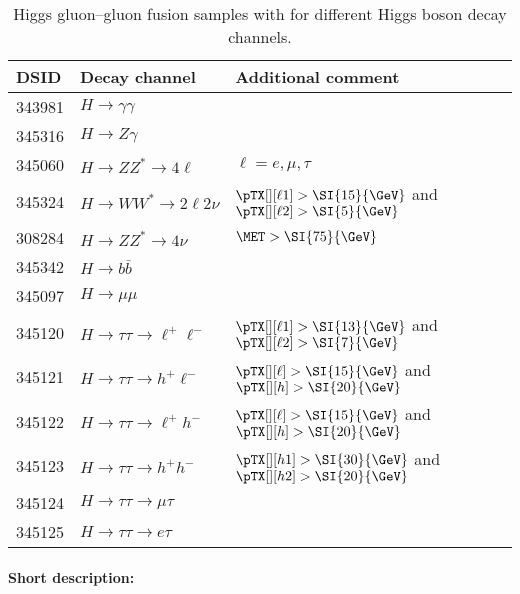 \begin{table}[!htbp]
  \caption{\POWHEG Higgs gluon--gluon fusion samples with \POWPY[8] for different Higgs boson decay channels.}%
  \label{tab:higgs-ggH-samples}
  \centering
  \begin{tabular}{ l | l | l}
    \toprule
    DSID   & Decay channel & Additional comment \\
    \midrule
    343981 & $H\to\gamma\gamma$&   \\
    345316 & $H\to Z\gamma$ & \\
    345060 & $H\to ZZ^{*} \to 4\ell $ & $\ell=e,\mu,\tau$   \\
    345324 & $H\to WW^{*} \to 2\ell2\nu $ &  $\pTX[][\ell1] > \SI{15}{\GeV}$ and $\pTX[][\ell2] > \SI{5}{\GeV}$ \\
    308284 & $H\to ZZ^{*}\to 4\nu$ & $\MET > \SI{75}{\GeV}$\\
    345342 & $H\to b \bar{b}$ & \\
    345097 & $H\to\mu\mu$      &     \\
    345120 & $H\to\tau\tau\to \ell^{+}\ell^{-}$ & $\pTX[][\ell1] > \SI{13}{\GeV}$ and $\pTX[][\ell2] > \SI{7}{\GeV}$ \\
    345121 & $H\to\tau\tau\to h^{+}\ell^{-}$    & $\pTX[][\ell]  > \SI{15}{\GeV}$ and $\pTX[][h]     > \SI{20}{\GeV}$ \\
    345122 & $H\to\tau\tau\to \ell^{+}h^{-}$    & $\pTX[][\ell]  > \SI{15}{\GeV}$ and $\pTX[][h]     > \SI{20}{\GeV}$ \\
    345123 & $H\to\tau\tau\to h^{+}h^{-}$       & $\pTX[][h1]    > \SI{30}{\GeV}$ and $\pTX[][h2]    > \SI{20}{\GeV}$ \\
    345124 & $H\to\tau\tau\to \mu\tau$          & \\ %
    345125 & $H\to\tau\tau\to e \tau$           & \\ %
    \bottomrule
  \end{tabular}
\end{table}

\paragraph{Short description:}

